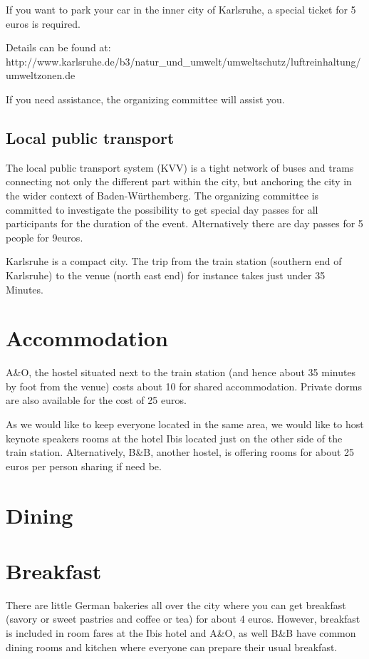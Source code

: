 If you want to park your car in the inner city of Karlsruhe, a special ticket for 5 euros is required. 

Details can be found at:
http://www.karlsruhe.de/b3/natur_und_umwelt/umweltschutz/luftreinhaltung/umweltzonen.de

If you need assistance, the organizing committee will assist you.

\subsection{Local public transport}



The local public transport system (KVV) is a tight network of buses and trams connecting not only the different part within the city, but anchoring the city in the wider context of Baden-Würthemberg. The organizing committee is committed to investigate the possibility to get special day passes for all participants for the duration of the event. Alternatively there are day passes for 5 people for 9euros.

Karlsruhe is a compact city. The trip from the train station (southern end of Karlsruhe) to the venue (north east end) for instance takes just under 35 Minutes.

\section{Accommodation}

A&O, the hostel situated next to the train station (and hence about 35 minutes by foot from the venue) costs about 10 for shared accommodation. Private dorms are also available for the cost of 25 euros. 

As we would like to keep everyone located in the same area, we would like to host keynote speakers rooms at the hotel Ibis located just on the other side of the train station. 
Alternatively, B&B, another hostel, is offering rooms for about 25 euros per person sharing if need be. 


\section{Dining}

\section{Breakfast}
There are little German bakeries all over the city where you can get breakfast (savory or sweet pastries and coffee or tea) for about 4 euros. However, breakfast is included in room fares at the Ibis hotel and A&O, as well B&B have common dining rooms and kitchen where everyone can prepare their usual breakfast.
 
